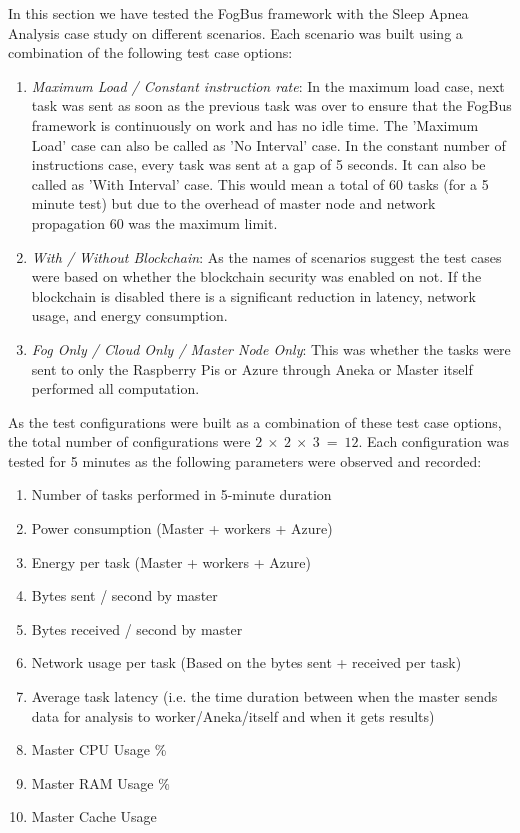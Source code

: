 \documentclass[10pt,journal,compsoc]{IEEEtran}
\begin{document}
In this section we have tested the FogBus framework with the Sleep Apnea Analysis case study on different scenarios. Each scenario was built using a combination of the following test case options:
\begin{enumerate}
\item \textit{Maximum Load / Constant instruction rate}:  In the maximum load case, next task was sent as soon as the previous task was over to ensure that the FogBus framework is continuously on work and has no idle time. The 'Maximum Load' case can also be called as 'No Interval' case. In the constant number of instructions case, every task was sent at a gap of 5 seconds. It can also be called as 'With Interval' case. This would mean a total of 60 tasks (for a 5 minute test) but due to the overhead of master node and network propagation 60 was the maximum limit.
\item  \textit{With / Without Blockchain}: As the names of scenarios suggest the test cases were based on whether the blockchain security was enabled on not. If the blockchain is disabled there is a significant reduction in latency, network usage, and energy consumption.
\item \textit{Fog Only / Cloud Only / Master Node Only}: This was whether the tasks were sent to only the Raspberry Pis or Azure through Aneka or Master itself performed all computation.
\end{enumerate}
As the test configurations were built as a combination of these test case options, the total number of configurations were $2 \  \times \ 2 \ \times \  3 \ =\  12$. Each configuration was tested for 5 minutes as the following parameters were observed and recorded:
\begin{enumerate}
\item Number of tasks performed in 5-minute duration
\item Power consumption (Master + workers + Azure)
\item Energy per task (Master + workers + Azure)
\item Bytes sent / second by master
\item Bytes received / second by master
\item Network usage per task (Based on the bytes sent + received per task)
\item Average task latency (i.e. the time duration between when the master sends data for analysis to worker/Aneka/itself and when it gets results)
\item Master CPU Usage \%
\item Master RAM Usage \%
\item Master Cache Usage
\end{enumerate}
\end{document}
